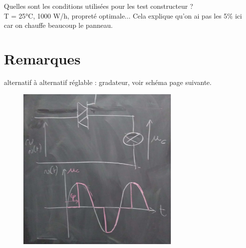 \documentclass[12pt,prb,aps,epsf]{article}
\begin{document}
Quelles sont les conditions utilisées pour les test constructeur ?\\
T = 25°C, 1000 W/h, propreté optimale... Cela explique qu'on ai pas les 5\% ici car on chauffe beaucoup le panneau.

\section*{Remarques}
alternatif à alternatif réglable : gradateur, voir schéma page suivante.

\begin{figure}[h]
	\centering \includegraphics[width=8cm]{gradateur}
\end{figure}
\end{document}
